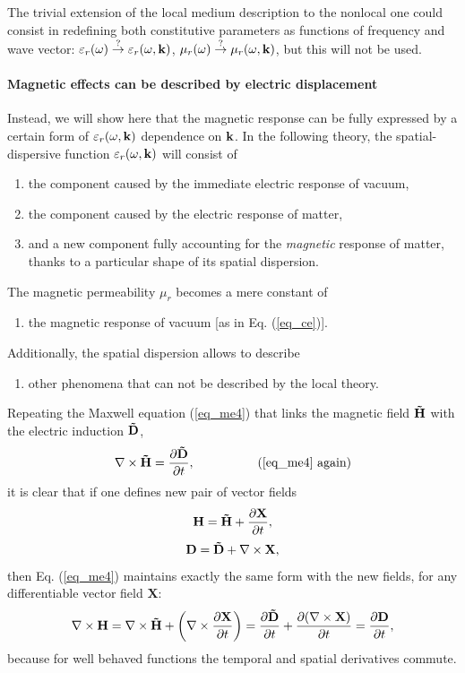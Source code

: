 The trivial extension of the local medium description to the nonlocal one could consist in redefining both constitutive parameters as functions of frequency and wave vector: $\varepsilon_r(\omega) \stackrel{?}{\rightarrow} \varepsilon_r(\omega, {\mathbf{k}})$, $\mu_r(\omega) \stackrel{?}{\rightarrow} \mu_r(\omega, {\mathbf{k}})$, but this will not be used. 

\paragraph{Magnetic effects can be described by electric displacement}%
Instead, we will show here that the magnetic response can be fully expressed by a certain form of $\varepsilon_r(\omega, {\mathbf{k}})$ dependence on ${\mathbf{k}}$. In the following theory, the spatial-dispersive function $\varepsilon_r(\omega, {\mathbf{k}})$ will consist of
\begin{enumerate}
 \item{the component caused by the immediate electric response of vacuum,} 
 \item{the component caused by the electric response of matter,}
 \item{and a new component fully accounting for the \textit{magnetic} response of matter, thanks to a particular shape of its spatial dispersion.}
\end{enumerate}
The magnetic permeability $\mu_r$ becomes a mere constant of
\begin{enumerate}[resume]
 \item{the magnetic response of vacuum [as in Eq. (\ref{eq_ce})].} 
\end{enumerate}
Additionally, the spatial dispersion allows to describe
\begin{enumerate}[resume]
 \item{other phenomena that can not be described by the local theory.} 
\end{enumerate}
Repeating the Maxwell equation (\ref{eq_me4}) that links the magnetic field $\mathbf{\tilde{H}}$ with the electric induction $\mathbf{\tilde{D}}$, 
$$ \nabla \times \mathbf{\tilde{H}} =  \frac{\partial \mathbf{\tilde{D}}} {\partial t},\quad\quad\quad\quad\quad\text{(\ref{eq_me4} again)}$$
it is clear that if one defines new pair of vector fields
\begin{equation} \mathbf{H} = \mathbf{\tilde{H}} + \frac{\partial\mathbf{X}}{\partial t}, \label{eq_HHsd}\end{equation}
\begin{equation} \mathbf{D}  = \mathbf{\tilde{D}}  + \nabla\times \mathbf{X}, \label{eq_Dsd}\end{equation}
then Eq. (\ref{eq_me4}) maintains exactly the same form with the new fields, for any differentiable vector field $\mathbf{X}$:
\begin{equation} \nabla \times \mathbf{H} = \nabla \times \mathbf{\tilde{H}} + \left(\nabla\times \frac{\partial\mathbf{X}}{\partial t}\right) = \frac{\partial \mathbf{\tilde{D}}}{\partial t}+ \frac{\partial(\nabla\times \mathbf{X})}{\partial t} =  \frac{\partial \mathbf{D}} {\partial t}, \label{eq_me4sd} \end{equation}
because for well behaved functions the temporal and spatial derivatives commute.

